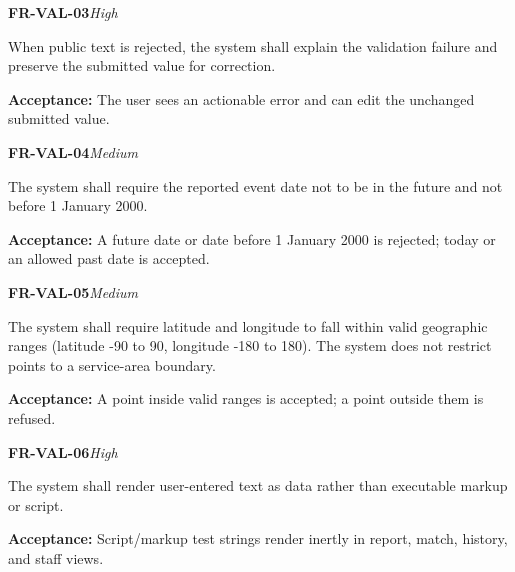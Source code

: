 \documentclass[12pt,a4paper,oneside]{report}
\begin{document}
\noindent\begin{minipage}{\linewidth}\textbf{FR-VAL-03}\hfill\textit{High}\par\nopagebreak

When public text is rejected, the system shall explain the validation failure and preserve the submitted value for correction.

{\color{muted}\textbf{Acceptance:} The user sees an actionable error and can edit the unchanged submitted value.\par}\end{minipage}\par\vspace{5pt}

\noindent\begin{minipage}{\linewidth}\textbf{FR-VAL-04}\hfill\textit{Medium}\par\nopagebreak

The system shall require the reported event date not to be in the future and not before 1 January 2000.

{\color{muted}\textbf{Acceptance:} A future date or date before 1 January 2000 is rejected; today or an allowed past date is accepted.\par}\end{minipage}\par\vspace{5pt}

\noindent\begin{minipage}{\linewidth}\textbf{FR-VAL-05}\hfill\textit{Medium}\par\nopagebreak

The system shall require latitude and longitude to fall within valid geographic ranges (latitude -90 to 90, longitude -180 to 180). The system does not restrict points to a service-area boundary.

{\color{muted}\textbf{Acceptance:} A point inside valid ranges is accepted; a point outside them is refused.\par}\end{minipage}\par\vspace{5pt}

\noindent\begin{minipage}{\linewidth}\textbf{FR-VAL-06}\hfill\textit{High}\par\nopagebreak

The system shall render user-entered text as data rather than executable markup or script.

{\color{muted}\textbf{Acceptance:} Script/markup test strings render inertly in report, match, history, and staff views.\par}\end{minipage}\par\vspace{5pt}
\end{document}
